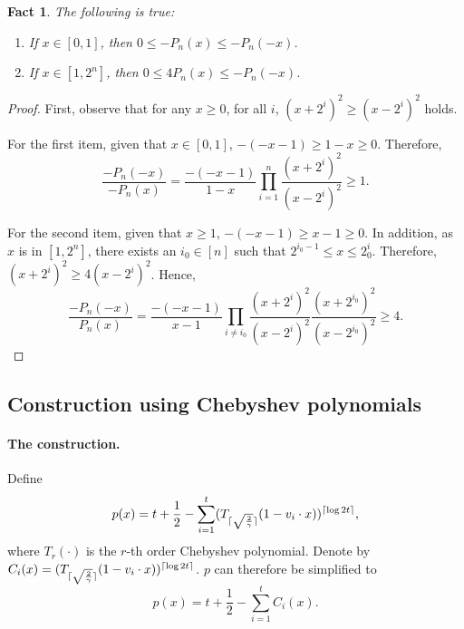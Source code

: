 \documentclass{article}
\DeclarePairedDelimiter\ceil{\lceil}{\rceil}
\newtheorem{fact}[theorem]{Fact}
\begin{document}
\begin{fact}
The following is true:
\begin{enumerate}
\item If $x \in [0,1]$, then $0 \leq -P_n(x) \leq -P_n(-x)$. \label{item:x-small}
\item If $x \in [1, 2^n]$, then $0 \leq 4P_n(x) \leq -P_n(-x)$. \label{item:x-large}
\end{enumerate}
\label{fact:pn}
\end{fact}
\begin{proof}
First, observe that for any $x \geq 0$, for all $i$, $(x+2^i)^2 \geq (x - 2^i)^2$ holds.

For the first item, given that $x \in [0,1]$, $-(-x-1) \geq 1-x \geq 0$. Therefore,
\[ \frac{-P_n(-x)}{-P_n(x)} = \frac{-(-x-1)}{1-x} \prod_{i =1}^n \frac{(x+2^i)^2}{(x - 2^i)^2}  \geq 1. \]

For the second item, given that $x \geq 1$, $-(-x-1) \geq x-1 \geq 0$. In addition, as $x$ is in $[1,2^n]$, there exists an $i_0 \in [n]$ such that $2^{i_0-1} \leq x \leq 2^i_0$. Therefore,
$(x+2^i)^2 \geq 4(x - 2^i)^2$. Hence,
\[ \frac{-P_n(-x)}{P_n(x)} = \frac{-(-x-1)}{ x-1} \prod_{i \neq i_0} \frac{(x+2^i)^2}{(x - 2^i)^2} \frac{(x+2^{i_0})^2}{(x - 2^{i_0})^2} \geq 4. \]

\end{proof}


\subsection{Construction using Chebyshev polynomials}
\paragraph{The construction.} Define
\[ p(x) = t + \frac 1 2 - \sum_{i=1}^t (T_{\ceil{\sqrt{\frac 2 \gamma}}}(1 - v_i \cdot x))^{\ceil{\log 2t}}, \]
where
$T_r(\cdot)$ is the $r$-th order Chebyshev polynomial. Denote by $C_i(x) = (T_{\ceil{\sqrt{\frac 2 \gamma}}}(1 - v_i \cdot x))^{\ceil{\log 2t}}$. $p$ can therefore be simplified to
\[ p(x) = t + \frac 1 2 - \sum_{i=1}^t C_i(x). \]
\end{document}
